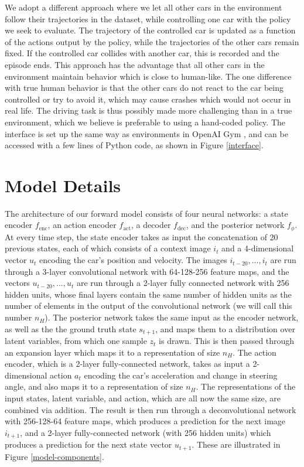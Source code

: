 \documentclass{article} %
\begin{document}
We adopt a different approach where we let all other cars in the environment follow their trajectories in the dataset, while controlling one car with the policy we seek to evaluate.
The trajectory of the controlled car is updated as a function of the actions output by the policy, while the trajectories of the other cars remain fixed.
If the controlled car collides with another car, this is recorded and the episode ends.
This approach has the advantage that all other cars in the environment maintain behavior which is close to human-like.
The one difference with true human behavior is that the other cars do not react to the car being controlled or try to avoid it, which may cause crashes which would not occur in real life.
The driving task is thus possibly made more challenging than in a true environment, which we believe is preferable to using a hand-coded policy.
The interface is set up the same way as environments in OpenAI Gym \citep{OpenAIBaselines}, and can be accessed with a few lines of Python code, as shown in Figure \ref{interface}.



\section{Model Details}
\label{model-details}

The architecture of our forward model consists of four neural networks: a state encoder $f_\text{enc}$, an action encoder $f_\text{act}$, a decoder $f_\text{dec}$, and the posterior network $f_\phi$.
At every time step, the state encoder takes as input the concatenation of 20 previous states, each of which consists of a context image $i_t$ and a 4-dimensional vector $u_t$ encoding the car's position and velocity.
The images $i_{t-20}, ..., i_t$ are run through a 3-layer convolutional network with 64-128-256 feature maps, and the vectors $u_{t-20}, ..., u_t$ are run through a 2-layer fully connected network with 256 hidden units, whose final layers contain the same number of hidden units as the number of elements in the output of the convolutional network (we will call this number $n_H$).
The posterior network takes the same input as the encoder network, as well as the the ground truth state $s_{t+1}$, and maps them to a distribution over latent variables, from which one sample $z_t$ is drawn.
This is then passed through an expansion layer which maps it to a representation of size $n_H$.
The action encoder, which is a 2-layer fully-connected network, takes as input a 2-dimensional action $a_t$ encoding the car's acceleration and change in steering angle, and also maps it to a representation of size $n_H$.
The representations of the input states, latent variable, and action, which are all now the same size, are combined via addition.
The result is then run through a deconvolutional network with 256-128-64 feature maps, which produces a prediction for the next image $i_{t+1}$, and a 2-layer fully-connected network (with 256 hidden units) which produces a prediction for the next state vector $u_{t+1}$. These are illustrated in Figure \ref{model-components}.
\end{document}
